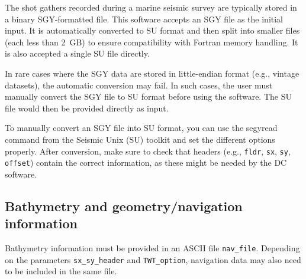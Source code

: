 \documentclass[11pt, oneside]{article}   	%
\begin{document}
The shot gathers recorded during a marine seismic survey are typically stored in a binary SGY-formatted file. This software accepts an SGY file as the initial input. It is automatically converted to SU format and then split into smaller files (each less than 2~GB) to ensure compatibility with Fortran memory handling. It is also accepted a single SU file directly.

In rare cases where the SGY data are stored in little-endian format (e.g., vintage datasets), the automatic conversion may fail. In such cases, the user must manually convert the SGY file to SU format before using the software. The SU file would then be provided directly as input.

To manually convert an SGY file into SU format, you can use the segyread command from the Seismic Unix (SU) toolkit and set the different options properly. After conversion, make sure to check that headers (e.g., \texttt{fldr}, \texttt{sx}, \texttt{sy}, \texttt{offset}) contain the correct information, as these might be needed by the DC software.


\subsection{Bathymetry and geometry/navigation information}\label{sec4b}

Bathymetry information must be provided in an ASCII file \texttt{nav\_file}. Depending on the parameters \texttt{sx\_sy\_header} and \texttt{TWT\_option}, navigation data may also need to be included in the same file.
\end{document}
